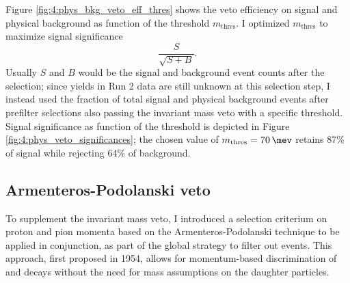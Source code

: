 Figure \ref{fig:4:phys_bkg_veto_eff_thres} shows the veto efficiency on \demonstratorshort signal and \physbkgshort physical background as function of the threshold $m_\text{thres}$.
I optimized $m_\text{thres}$ to maximize signal significance
\begin{equation}
\frac{S}{\sqrt{S+B}}.
\label{eq:4:signal_significance}
\end{equation}
Usually $S$ and $B$ would be the signal and background event counts after the selection;
since yields in Run 2 data are still unknown at this selection step, I instead used the fraction of total signal and physical background events after prefilter selections also passing the invariant mass veto with a specific threshold.
Signal significance as function of the threshold is depicted in Figure \ref{fig:4:phys_veto_significances};
the chosen value of $m_\text{thres} = \SI{70}{\mev}$ retains 87\% of signal while rejecting 64\% of background.

\subsection{Armenteros-Podolanski veto}
To supplement the invariant mass veto, I introduced a selection criterium on proton and pion momenta based on the Armenteros-Podolanski technique \cite{armenteros-podolanski} to be applied in conjunction, as part of the global strategy to filter out \physbkgshort events.
This approach, first proposed in 1954, allows for momentum-based discrimination of \lambdadecay and \kshortdecay decays without the need for mass assumptions on the daughter particles.

